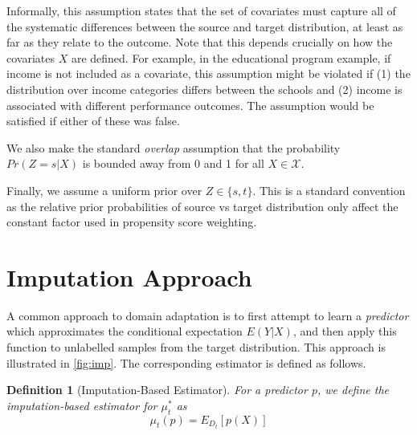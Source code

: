 \documentclass{article} %
\newtheorem{definition}{Definition}
\begin{document}
Informally, this assumption states that the set of covariates must capture all of the systematic differences between the source and target distribution, at least as far as they relate to the outcome. Note that this depends crucially on how the covariates $X$ are defined. For example, in the educational program example, if income is not included as a covariate, this assumption might be violated if (1) the distribution over income categories differs between the schools and (2) income is associated with different performance outcomes. The assumption would be satisfied if either of these was false.

We also make the standard \emph{overlap} assumption that the probability $Pr(Z=s|X)$ is bounded away from 0 and 1 for all $X \in \mathcal{X}$.

Finally, we assume a uniform prior over $Z \in \{s,t\}$. This is a standard convention as the relative prior probabilities of source vs target distribution only affect the constant factor used in propensity score weighting.   






\section{Imputation Approach}

A common approach to domain adaptation is to first attempt to learn a \emph{predictor} which approximates the conditional expectation $E(Y|X)$, and then apply this function to unlabelled samples from the target distribution. This approach is illustrated in \ref{fig:imp}. The corresponding estimator is defined as follows.

\begin{definition}[Imputation-Based Estimator]
\label{impest}
For a predictor $p$, we define the imputation-based estimator for $\mu_t^*$ as
\begin{equation*}
    \mu_t(p) = E_{D_t}[p(X)]
\end{equation*}
\end{definition}
\end{document}
